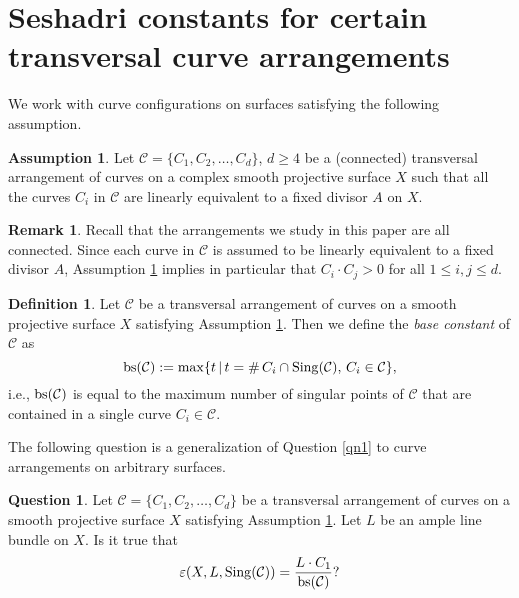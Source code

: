 \documentclass[12pt,reqno]{amsart}
\theoremstyle{plain}
\numberwithin{equation}{section}
\theoremstyle{definition}
\newtheorem{question}[theorem]{Question}
\newtheorem{definition}[theorem]{Definition}
\newtheorem{remark}[theorem]{Remark}
\newtheorem{assumption}[theorem]{Assumption}
\begin{document}
	\section{Seshadri constants for certain transversal curve arrangements}\label{main}	
	We work with curve configurations on surfaces satisfying the following assumption. 
	\begin{assumption}\label{star1}
		Let $\mathcal{C}=\{C_1,C_2, \ldots ,C_d\}$, $d\geq 4$ be a (connected) 
  transversal arrangement of curves 
		on a complex smooth projective surface $X$ such that all the curves 
  $C_i$ in $\mathcal{C}$ are linearly equivalent to a
			fixed divisor $A$ on $X$.
	\end{assumption}

 \begin{remark} 
Recall that the arrangements we study in this paper are all connected. Since each curve in $\mathcal{C}$ is assumed to be linearly equivalent to a fixed divisor $A$, 
Assumption \ref{star1} implies in particular that $C_i\cdot C_j > 0$ for all $1\le i,j \le d$.  
 \end{remark}
	\begin{definition}
		Let $\mathcal{C}$ be a transversal arrangement of curves on a smooth projective surface $X$
		satisfying Assumption \ref{star1}. Then we define the \emph{base constant} of $\mathcal{C}$ as 
		$${\rm bs}(\mathcal{C}) := {\rm max} \{t \, | \, t = \# \, C_{i} \cap {\rm Sing}(\mathcal{C}), \, C_{i} \in \mathcal{C}\},$$
		i.e., ${\rm bs}(\mathcal{C})$ is equal to the maximum number of singular points  of $\mathcal{C}$ that are contained in a single curve $C_{i} \in \mathcal{C}$.
	\end{definition}

The following question is a generalization of Question \ref{qn1} to curve arrangements on arbitrary surfaces. 


	\begin{question}\label{question}
		Let $\mathcal{C} =\{C_1,C_2, \ldots ,C_d\}$ be a transversal arrangement of curves on a smooth projective surface $X$
		satisfying Assumption \ref{star1}. Let $L$ be an ample line bundle on $X$. Is it true that
		\begin{equation*}\varepsilon(X, L,{\rm Sing}(\mathcal{C})) = \frac{L \cdot C_1}{{\rm bs}(\mathcal{C})}?
		\end{equation*}
	\end{question}
\end{document}
